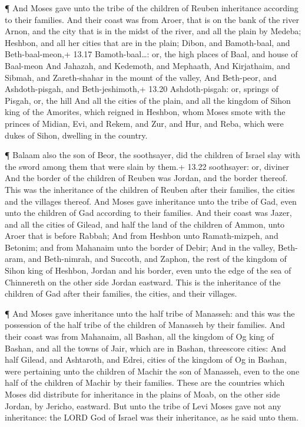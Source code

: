  ¶ And Moses gave unto the tribe of the children of Reuben
inheritance according to their families.  And their coast
was from Aroer, that is on the bank of the river Arnon, and the city
that is in the midst of the river, and all the plain by Medeba;
 Heshbon, and all her cities that are in the plain; Dibon,
and Bamoth-baal, and Beth-baal-meon,+ 13.17 Bamoth-baal\ldots: or, the
high places of Baal, and house of Baal-meon  And Jahazah,
and Kedemoth, and Mephaath,  And Kirjathaim, and Sibmah,
and Zareth-shahar in the mount of the valley,  And
Beth-peor, and Ashdoth-pisgah, and Beth-jeshimoth,+ 13.20
Ashdoth-pisgah: or, springs of Pisgah, or, the hill  And
all the cities of the plain, and all the kingdom of Sihon king of the
Amorites, which reigned in Heshbon, whom Moses smote with the princes of
Midian, Evi, and Rekem, and Zur, and Hur, and Reba, which were dukes of
Sihon, dwelling in the country.

 ¶ Balaam also the son of Beor, the soothsayer, did the
children of Israel slay with the sword among them that were slain by
them.+ 13.22 soothsayer: or, diviner  And the border of the
children of Reuben was Jordan, and the border thereof. This was the
inheritance of the children of Reuben after their families, the cities
and the villages thereof.  And Moses gave inheritance unto
the tribe of Gad, even unto the children of Gad according to their
families.  And their coast was Jazer, and all the cities of
Gilead, and half the land of the children of Ammon, unto Aroer that is
before Rabbah;  And from Heshbon unto Ramath-mizpeh, and
Betonim; and from Mahanaim unto the border of Debir;  And
in the valley, Beth-aram, and Beth-nimrah, and Succoth, and Zaphon, the
rest of the kingdom of Sihon king of Heshbon, Jordan and his border,
even unto the edge of the sea of Chinnereth on the other side Jordan
eastward.  This is the inheritance of the children of Gad
after their families, the cities, and their villages.

 ¶ And Moses gave inheritance unto the half tribe of
Manasseh: and this was the possession of the half tribe of the children
of Manasseh by their families.  And their coast was from
Mahanaim, all Bashan, all the kingdom of Og king of Bashan, and all the
towns of Jair, which are in Bashan, threescore cities:  And
half Gilead, and Ashtaroth, and Edrei, cities of the kingdom of Og in
Bashan, were pertaining unto the children of Machir the son of Manasseh,
even to the one half of the children of Machir by their families.
 These are the countries which Moses did distribute for
inheritance in the plains of Moab, on the other side Jordan, by Jericho,
eastward.  But unto the tribe of Levi Moses gave not any
inheritance: the LORD God of Israel was their inheritance, as he said
unto them.


